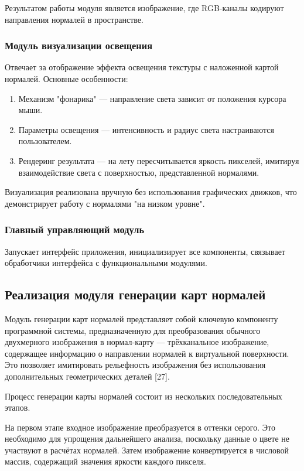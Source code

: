 Результатом работы модуля является изображение, где RGB-каналы кодируют направления нормалей в пространстве.
\subsubsection{Модуль визуализации освещения}

Отвечает за отображение эффекта освещения текстуры с наложенной картой нормалей. Основные особенности:
\begin{enumerate}
	\item Механизм "фонарика" — направление света зависит от положения курсора мыши.
	\item Параметры освещения — интенсивность и радиус света настраиваются пользователем.
	\item Рендеринг результата — на лету пересчитывается яркость пикселей, имитируя взаимодействие света с поверхностью, представленной нормалями.
\end{enumerate}

Визуализация реализована вручную без использования графических движков, что демонстрирует работу с нормалями "на низком уровне".
\subsubsection{Главный управляющий модуль}

Запускает интерфейс приложения, инициализирует все компоненты, связывает обработчики интерфейса с функциональными модулями.
\subsection{Реализация модуля генерации карт нормалей}

Модуль генерации карт нормалей представляет собой ключевую компоненту программной системы, предназначенную для преобразования обычного двухмерного изображения в нормал-карту — трёхканальное изображение, содержащее информацию о направлении нормалей к виртуальной поверхности. Это позволяет имитировать рельефность изображения без использования дополнительных геометрических деталей [27].

Процесс генерации карты нормалей состоит из нескольких последовательных этапов.

На первом этапе входное изображение преобразуется в оттенки серого. Это необходимо для упрощения дальнейшего анализа, поскольку данные о цвете не участвуют в расчётах нормалей. Затем изображение конвертируется в числовой массив, содержащий значения яркости каждого пикселя.

